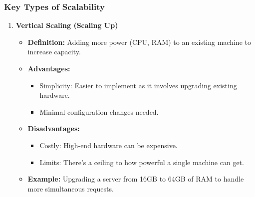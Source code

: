 \documentclass{beamer}
\begin{document}
\begin{frame}[fragile]
    \frametitle{Key Types of Scalability}
    \begin{enumerate}
        \item \textbf{Vertical Scaling (Scaling Up)}
            \begin{itemize}
                \item \textbf{Definition:} Adding more power (CPU, RAM) to an existing machine to increase capacity.
                \item \textbf{Advantages:}
                    \begin{itemize}
                        \item Simplicity: Easier to implement as it involves upgrading existing hardware.
                        \item Minimal configuration changes needed.
                    \end{itemize}
                \item \textbf{Disadvantages:}
                    \begin{itemize}
                        \item Costly: High-end hardware can be expensive.
                        \item Limits: There's a ceiling to how powerful a single machine can get.
                    \end{itemize}
                \item \textbf{Example:} Upgrading a server from 16GB to 64GB of RAM to handle more simultaneous requests.
            \end{itemize}


\end{enumerate}
\end{frame}
\end{document}
